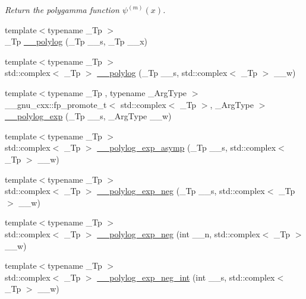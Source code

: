 \begin{DoxyCompactItemize}
\begin{DoxyCompactList}\small\item\em Return the polygamma function $ \psi^{(m)}(x) $. \end{DoxyCompactList}\item 
{\footnotesize template$<$typename \+\_\+\+Tp $>$ }\\\+\_\+\+Tp \hyperlink{namespacestd_1_1____detail_a17fb8cea11706f319aaea277188a29c8}{\+\_\+\+\_\+polylog} (\+\_\+\+Tp \+\_\+\+\_\+s, \+\_\+\+Tp \+\_\+\+\_\+x)
\item 
{\footnotesize template$<$typename \+\_\+\+Tp $>$ }\\std\+::complex$<$ \+\_\+\+Tp $>$ \hyperlink{namespacestd_1_1____detail_aa14e3ca6e4bee5ac1f1e5e1c2cee1d5a}{\+\_\+\+\_\+polylog} (\+\_\+\+Tp \+\_\+\+\_\+s, std\+::complex$<$ \+\_\+\+Tp $>$ \+\_\+\+\_\+w)
\item 
{\footnotesize template$<$typename \+\_\+\+Tp , typename \+\_\+\+Arg\+Type $>$ }\\\+\_\+\+\_\+gnu\+\_\+cxx\+::fp\+\_\+promote\+\_\+t$<$ std\+::complex$<$ \+\_\+\+Tp $>$, \+\_\+\+Arg\+Type $>$ \hyperlink{namespacestd_1_1____detail_a0f6f2fc92d4ccec43975a6b9aca9851a}{\+\_\+\+\_\+polylog\+\_\+exp} (\+\_\+\+Tp \+\_\+\+\_\+s, \+\_\+\+Arg\+Type \+\_\+\+\_\+w)
\item 
{\footnotesize template$<$typename \+\_\+\+Tp $>$ }\\std\+::complex$<$ \+\_\+\+Tp $>$ \hyperlink{namespacestd_1_1____detail_af3684fc449da490e9a43985245618a90}{\+\_\+\+\_\+polylog\+\_\+exp\+\_\+asymp} (\+\_\+\+Tp \+\_\+\+\_\+s, std\+::complex$<$ \+\_\+\+Tp $>$ \+\_\+\+\_\+w)
\item 
{\footnotesize template$<$typename \+\_\+\+Tp $>$ }\\std\+::complex$<$ \+\_\+\+Tp $>$ \hyperlink{namespacestd_1_1____detail_a07b26b8c7ff467310e4e1df6e3efd893}{\+\_\+\+\_\+polylog\+\_\+exp\+\_\+neg} (\+\_\+\+Tp \+\_\+\+\_\+s, std\+::complex$<$ \+\_\+\+Tp $>$ \+\_\+\+\_\+w)
\item 
{\footnotesize template$<$typename \+\_\+\+Tp $>$ }\\std\+::complex$<$ \+\_\+\+Tp $>$ \hyperlink{namespacestd_1_1____detail_a313ae48e1c4ed3c5296c8e45614af3d5}{\+\_\+\+\_\+polylog\+\_\+exp\+\_\+neg} (int \+\_\+\+\_\+n, std\+::complex$<$ \+\_\+\+Tp $>$ \+\_\+\+\_\+w)
\item 
{\footnotesize template$<$typename \+\_\+\+Tp $>$ }\\std\+::complex$<$ \+\_\+\+Tp $>$ \hyperlink{namespacestd_1_1____detail_a02b154619b2e4d0bf50dc303370d74cd}{\+\_\+\+\_\+polylog\+\_\+exp\+\_\+neg\+\_\+int} (int \+\_\+\+\_\+s, std\+::complex$<$ \+\_\+\+Tp $>$ \+\_\+\+\_\+w)

\end{DoxyCompactItemize}
